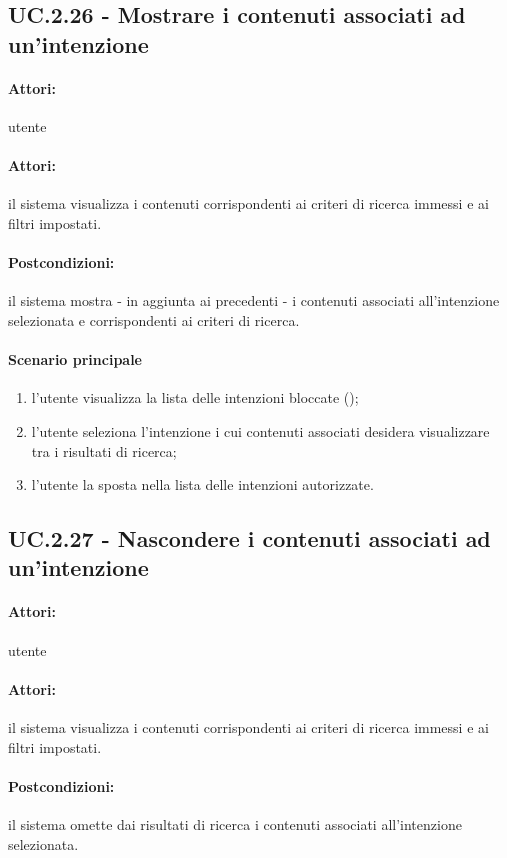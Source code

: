 \documentclass[10pt,a4paper,headinclude,footinclude,hidelinks]{scrreprt} %
\begin{document}
	\subsection[UC.2.26]{UC.2.26 - Mostrare i contenuti associati ad un'intenzione}
	\label{sec:stage:ar:uc:2_26}
	\paragraph{Attori:} utente
	\paragraph{Attori:} il sistema visualizza i contenuti corrispondenti ai criteri di ricerca immessi e ai filtri impostati.
	\paragraph{Postcondizioni:} il sistema mostra - in aggiunta ai precedenti - i contenuti associati all'intenzione selezionata e corrispondenti ai criteri di ricerca.
	\paragraph{Scenario principale}
	\begin{enumerate}
	\item l'utente visualizza la lista delle intenzioni bloccate ();
	\item l'utente seleziona l'intenzione i cui contenuti associati desidera visualizzare tra i risultati di ricerca;
	\item l'utente la sposta nella lista delle intenzioni autorizzate.
	\end{enumerate}

	\subsection[UC.2.27]{UC.2.27 - Nascondere i contenuti associati ad un'intenzione}
	\label{sec:stage:ar:uc:2_27}
	\paragraph{Attori:} utente
	\paragraph{Attori:} il sistema visualizza i contenuti corrispondenti ai criteri di ricerca immessi e ai filtri impostati.
	\paragraph{Postcondizioni:} il sistema omette dai risultati di ricerca i contenuti associati all'intenzione selezionata.
\end{document}
